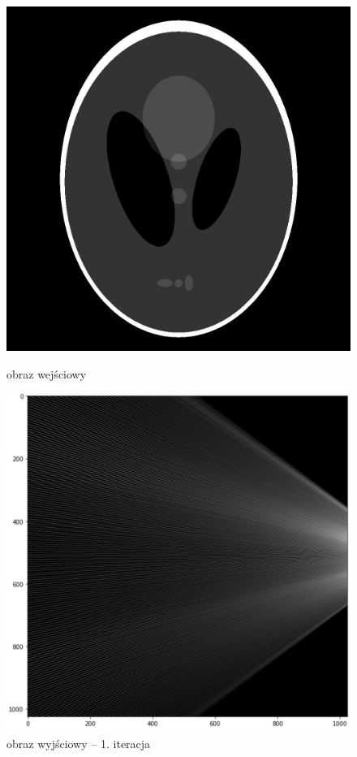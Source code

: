 \documentclass[polish,polish,a4paper]{article}
\begin{document}
					\begin{figure}[!h]
						\centering
						\begin{minipage}{0.45\linewidth}
							\includegraphics[width=\linewidth]{../tomograf-zdjecia/Shepp_logan.jpg} 
							\caption{obraz wejściowy}
						\end{minipage}
						\hfill
						\begin{minipage}{0.45\linewidth}
							\includegraphics[width=\linewidth]{img/out_1.png}
							\caption{obraz wyjściowy -- 1. iteracja}
						\end{minipage}
					\end{figure} 
				
\end{document}
